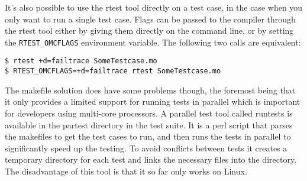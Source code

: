It's also possible to use the rtest tool directly on a test case, in the case
when you only want to run a single test case. Flags can be passed to the
compiler through the rtest tool either by giving them directly on the command
line, or by setting the \texttt{RTEST_OMCFLAGS} environment variable. The
following two calls are equivalent:
\begin{lstlisting}
$ rtest +d=failtrace SomeTestcase.mo
$ RTEST_OMCFLAGS=+d=failtrace rtest SomeTestcase.mo
\end{lstlisting}

The makefile solution does have some problems though, the foremost being that it
only provides a limited support for running tests in parallel which is important
for developers using multi-core processors. A parallel test tool called runtests
is available in the partest directory in the test suite. It is a perl script
that parses the makefiles to get the test cases to run, and then runs the tests
in parallel to significantly speed up the testing. To avoid conflicts between
tests it creates a temporary directory for each test and links the necessary
files into the directory. The disadvantage of this tool is that it so far only
works on Linux.

